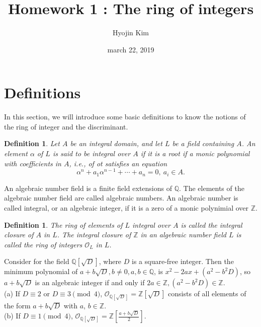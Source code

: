 \documentclass[11pt,a4paper,reqno]{amsart}
\numberwithin{equation}{section}
\newtheorem{defn}[thm]{Definition}
\begin{document}
 


\title{Homework 1 : The ring of integers} 
\author{Hyojin Kim} 
\date{march 22, 2019} 
\maketitle 

\section{Definitions} 

In this section, we will introduce some basic definitions to know the notions of the ring of integer and the discriminant. 

\begin{defn}
Let $A$ be an integral domain, and let $L$ be a field containing $A$. 
An element $\alpha$ of $L$ is said to be integral over $A$ 
if it is a root if a monic polynomial with coefficients in $A$, 
i.e., of ot satisfies an equation 
\[ 
\alpha^n + a_1 \alpha^{n-1} + \cdots + a_n = 0,~a_i \in A. 
\] 
\end{defn}

An algebraic number field is a finite field extensions of $\mathbb{Q}$. 
The elements of the algebraic number field are called algebraic numbers. 
An algebraic number is called integral, or an algebraic integer, if it is a zero of a monic polynimial over $\mathbb{Z}$.

\begin{defn} \label{defn 2.5} 
The ring of elements of $L$ integral over $A$ is called the integral closure of $A$ in $L$. 
The integral closure of $\mathbb{Z}$ in an algebraic number field $L$ 
is called the ring of integers $\mathcal{O}_L$ in $L$. 
\end{defn} 

Consider for the field $\mathbb{Q}[\sqrt{D}]$, where $D$ is a square-free integer. 
Then the minimum polynomial of $a+b\sqrt{D} ,b\neq 0,a,b\in\mathbb{Q}$, is $x^2 - 2ax + (a^2 -b^2 D)$,
so $a+b\sqrt{D}$ is an algebraic integer
if and only if $2a \in \mathbb{Z}, (a^2 -b^2 D) \in \mathbb{Z}$.\\
(a) If $D \equiv 2$ or $D \equiv 3 \pmod 4$, $\mathcal{O}_{\mathbb{Q}[\sqrt{D}]}=\mathbb{Z}[\sqrt{D}]$ consists of all elements of the form $a+b \sqrt{D}$ with $a$, $b \in \mathbb{Z}$.\\
(b) If $D \equiv 1 \pmod 4 $, $\mathcal{O}_{\mathbb{Q}[\sqrt{D}]}=\mathbb{Z}[\frac{a+b \sqrt{D}}{2}]$.
\end{document}

